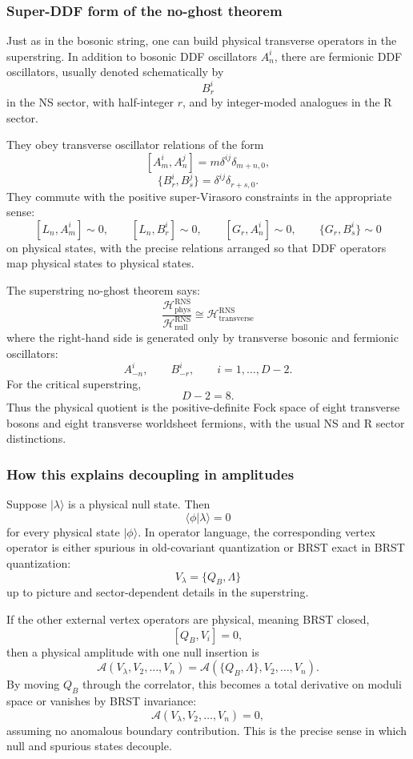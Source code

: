 \documentclass[
  10pt,
  a4paper,
  openany]{book}
\begin{document}
\subsubsection{Super-DDF form of the no-ghost
theorem}\label{super-ddf-form-of-the-no-ghost-theorem}

Just as in the bosonic string, one can build physical transverse
operators in the superstring. In addition to bosonic DDF oscillators
\(A_n^i\), there are fermionic DDF oscillators, usually denoted
schematically by \[
B_r^i
\] in the NS sector, with half-integer \(r\), and by integer-moded
analogues in the R sector.

They obey transverse oscillator relations of the form \[
[A_m^i,A_n^j]
=
m\delta^{ij}\delta_{m+n,0},
\] \[
\{B_r^i,B_s^j\}
=
\delta^{ij}\delta_{r+s,0}.
\] They commute with the positive super-Virasoro constraints in the
appropriate sense: \[
[L_n,A_m^i]\sim 0,
\qquad
[L_n,B_r^i]\sim 0,
\qquad
[G_r,A_n^i]\sim 0,
\qquad
\{G_r,B_s^i\}\sim 0
\] on physical states, with the precise relations arranged so that DDF
operators map physical states to physical states.

The superstring no-ghost theorem says: \[
\boxed{
\frac{\mathcal H_{\text{phys}}^{\text{RNS}}}
{\mathcal H_{\text{null}}^{\text{RNS}}}
\cong
\mathcal H_{\text{transverse}}^{\text{RNS}}
}
\] where the right-hand side is generated only by transverse bosonic and
fermionic oscillators: \[
A_{-n}^i,
\qquad
B_{-r}^i,
\qquad
i=1,\dots,D-2.
\] For the critical superstring, \[
D-2=8.
\] Thus the physical quotient is the positive-definite Fock space of
eight transverse bosons and eight transverse worldsheet fermions, with
the usual NS and R sector distinctions.

\subsubsection{How this explains decoupling in
amplitudes}\label{how-this-explains-decoupling-in-amplitudes}

Suppose \(|\lambda\rangle\) is a physical null state. Then \[
\langle \phi|\lambda\rangle=0
\] for every physical state \(|\phi\rangle\). In operator language, the
corresponding vertex operator is either spurious in old-covariant
quantization or BRST exact in BRST quantization: \[
V_\lambda
=
\{Q_B,\Lambda\}
\] up to picture and sector-dependent details in the superstring.

If the other external vertex operators are physical, meaning BRST
closed, \[
[Q_B,V_i]=0,
\] then a physical amplitude with one null insertion is \[
\mathcal A(V_\lambda,V_2,\dots,V_n)
=
\mathcal A(\{Q_B,\Lambda\},V_2,\dots,V_n).
\] By moving \(Q_B\) through the correlator, this becomes a total
derivative on moduli space or vanishes by BRST invariance: \[
\mathcal A(V_\lambda,V_2,\dots,V_n)=0,
\] assuming no anomalous boundary contribution. This is the precise
sense in which null and spurious states decouple.
\end{document}
